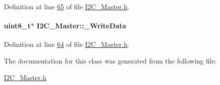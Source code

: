 Definition at line \hyperlink{_i2_c___master_8h_source_l00065}{65} of file \hyperlink{_i2_c___master_8h_source}{I2C\_\-Master.h}.

\hypertarget{class_i2_c___master_a2264d47bd650403c72080dc09b304680}{
\paragraph[{\_\-WriteData}]{\setlength{\rightskip}{0pt plus 5cm}uint8\_\-t$\ast$ {\bf I2C\_\-Master::\_\-WriteData}}\hfill}
\label{class_i2_c___master_a2264d47bd650403c72080dc09b304680}


Definition at line \hyperlink{_i2_c___master_8h_source_l00064}{64} of file \hyperlink{_i2_c___master_8h_source}{I2C\_\-Master.h}.



The documentation for this class was generated from the following file:\begin{DoxyCompactItemize}
\item 
\hyperlink{_i2_c___master_8h}{I2C\_\-Master.h}\end{DoxyCompactItemize}

